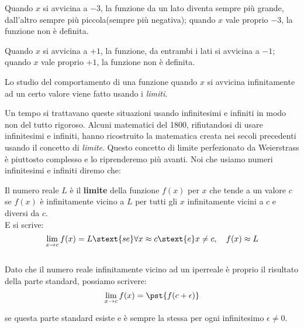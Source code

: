 Quando \(x\) si avvicina a \(-3\), la funzione da un lato diventa sempre più 
grande, dall'altro sempre più piccola(sempre più negativa);
quando \(x\) vale proprio \(-3\), la funzione non è definita.

Quando \(x\) si avvicina a \(+1\), la funzione, da entrambi i lati si 
avvicina a \(-1\);
quando \(x\) vale proprio \(+1\), la funzione non è definita.


Lo studio del comportamento di una funzione quando \(x\) si avvicina 
infinitamente ad un certo valore viene fatto usando i \emph{limiti}.

Un tempo si trattavano queste situazioni usando infinitesimi e infiniti in 
modo non del tutto rigoroso.
Alcuni matematici del 1800, rifiutandosi di usare infinitesimi e infiniti, 
hanno ricostruito la matematica creata nei secoli precedenti usando il 
concetto di \emph{limite}.
Questo concetto di limite perfezionato da Weierstrass è piuttosto 
complesso e lo riprenderemo più avanti.
Noi che usiamo numeri infinitesimi e infiniti diremo che:

\begin{definizione}
Il numero reale \(L\) è il \textbf{limite} della funzione \(f(x)\) 
per \(x\) che tende a un valore \(c\) se \(f(x)\) è infinitamente vicino a 
\(L\) per tutti gli \(x\) infinitamente vicini a \(c\) e diversi da 
\(c\).\\
E si scrive:
\[\lim_{x \to c} f(x) = L \stext{ se } \forall x \approx c \stext{ e } 
x \neq c, \quad f(x) \approx L\] \\
Dato che il numero reale infinitamente vicino ad un iperreale è proprio il 
risultato della parte standard, possiamo scrivere:
\[\lim_{x \to c} f(x) = \pst{f(c + \epsilon)} \]

\vspace{-1.5em}
\begin{center} 
se questa parte standard esiste e è sempre la stessa 
per ogni infinitesimo \(\epsilon \neq 0\).
\end{center}
\end{definizione}

